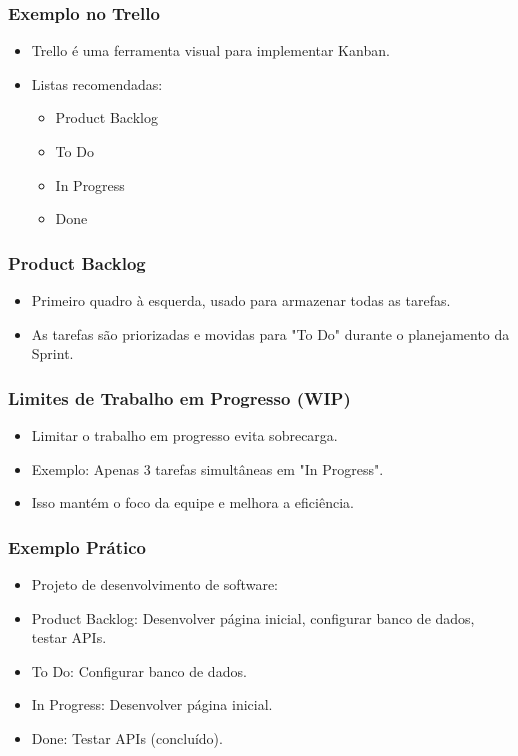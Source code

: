 \documentclass{beamer}
\begin{document}
\begin{frame}
    \frametitle{Exemplo no Trello}
    \begin{itemize}
        \item Trello é uma ferramenta visual para implementar Kanban.
        \item Listas recomendadas:
        \begin{itemize}
            \item Product Backlog
            \item To Do
            \item In Progress
            \item Done
        \end{itemize}
    \end{itemize}
\end{frame}

\begin{frame}
    \frametitle{Product Backlog}
    \begin{itemize}
        \item Primeiro quadro à esquerda, usado para armazenar todas as tarefas.
        \item As tarefas são priorizadas e movidas para "To Do" durante o planejamento da Sprint.
    \end{itemize}
\end{frame}

\begin{frame}
    \frametitle{Limites de Trabalho em Progresso (WIP)}
    \begin{itemize}
        \item Limitar o trabalho em progresso evita sobrecarga.
        \item Exemplo: Apenas 3 tarefas simultâneas em "In Progress".
        \item Isso mantém o foco da equipe e melhora a eficiência.
    \end{itemize}
\end{frame}

\begin{frame}
    \frametitle{Exemplo Prático}
    \begin{itemize}
        \item Projeto de desenvolvimento de software:
        \item Product Backlog: Desenvolver página inicial, configurar banco de dados, testar APIs.
        \item To Do: Configurar banco de dados.
        \item In Progress: Desenvolver página inicial.
        \item Done: Testar APIs (concluído).
    \end{itemize}
\end{frame}
\end{document}
